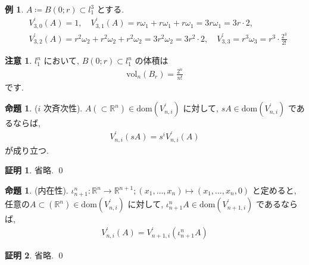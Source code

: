 \documentclass[10pt, fleqn, label-section=none]{bxjsarticle}
\theoremstyle{definition}
\newtheorem{ex}[dfn]{例}
\newtheorem{prop}[dfn]{命題}
\newtheorem*{pf*}{証明}
\newtheorem{remark}[dfn]{注意}
\newcommand{\vol}{\textrm{vol}}
\newcommand{\dom}{\textrm{dom}}
\renewcommand{\;}{\, ; \,}
\begin{document}
\begin{ex}$A \coloneqq B(0; r) \subset l^3_1$ とする. 
\begin{align*} &V^\prime_{3, 0}(A) = 1, \quad V^\prime_{3, 1}(A) = r \omega_1 + r \omega_1 + r\omega_1 = 3 r \omega_1 = 3r\cdot 2, \\&V^\prime_{3, 2} (A) = r^2 \omega_2 + r^2 \omega_2 + r^2 \omega_2 = 3 r^2 \omega_2 = 3r^2 \cdot 2, \quad V^\prime_{3, 3} = r^3  \omega_3 = r^3 \cdot \frac{2^3}{2!} \end{align*}
\end{ex}

\begin{remark}$l^n_1$ において, $B(0; r) \subset l^n_1$ の体積は
\begin{align*} \vol_n (B_r) =  \frac{2^n}{n!}\end{align*}
です. 
\end{remark}

\begin{prop}($i$ 次斉次性). $A ( \subset \mathbb R^n )\in \dom(V^\prime_{n, i })  $ に対して, $sA \in  \dom(V^\prime_{n, i }) $ であるならば, 
\begin{align*} V^\prime_{n, i }   (sA) = s^i V^\prime_{n, i }(A)\end{align*}
が成り立つ. 
\end{prop}
\begin{pf*}
省略. 
\qed
\end{pf*}

\begin{prop}(内在性). $\iota^n_{n+1}: \mathbb R^n \rightarrow \mathbb R^{n+1}; (x_1, \ldots, x_n) \mapsto (x_1, \ldots, x_n, 0) $ と定めると, 任意の$A \subset (\mathbb R^n) \in \dom(V^\prime_{n, i }) $ に対して, $\iota^n_{n+1} A \in \dom(V^\prime_{n + 1, i }) $ であるならば, 
\begin{align*} V^\prime_{n, i } (A) =  V^\prime_{n+ 1, i }(\iota^n_{n+1} A)  \end{align*}

\end{prop}
\begin{pf*}
省略. 
\qed
\end{pf*}
\end{document}
